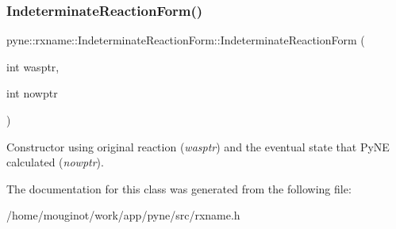 \subsubsection{\texorpdfstring{Indeterminate\+Reaction\+Form()}{IndeterminateReactionForm()}\hspace{0.1cm}{\footnotesize\ttfamily [4/4]}}
{\footnotesize\ttfamily pyne\+::rxname\+::\+Indeterminate\+Reaction\+Form\+::\+Indeterminate\+Reaction\+Form (\begin{DoxyParamCaption}\item[{int}]{wasptr,  }\item[{int}]{nowptr }\end{DoxyParamCaption})\hspace{0.3cm}{\ttfamily [inline]}}

Constructor using original reaction ({\itshape wasptr}) and the eventual state that Py\+NE calculated ({\itshape nowptr}). 

The documentation for this class was generated from the following file\+:\begin{DoxyCompactItemize}
\item 
/home/mouginot/work/app/pyne/src/rxname.\+h\end{DoxyCompactItemize}
